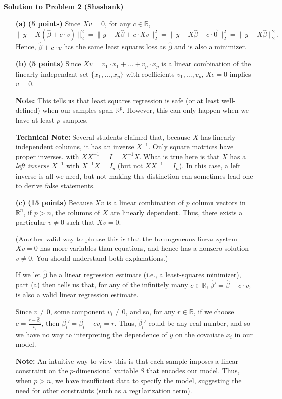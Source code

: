 \documentclass[11pt]{article}
\newcommand{\R}{\mathbb{R}}
\def\inv{^{-1}}
\begin{document}
\begin{framed}
{\bf\large Solution to Problem 2 (Shashank)}

\begin{enumerate}
\item[{\bf (a)}] {\bf (5 points)}
Since $Xv = 0$, for any $c \in \R$,
\[\|y - X(\hat\beta + c \cdot v)\|_2^2
    = \|y - X\hat\beta + c \cdot Xv\|_2^2
    = \|y - X\hat\beta + c \cdot \vec 0\|_2^2
    = \|y - X\hat\beta\|_2^2.
\]
Hence, $\hat\beta + c \cdot v$ has the same least squares loss as $\hat\beta$
and is also a minimizer.

\item[{\bf (b)}] {\bf (5 points)}
Since $Xv = v_1 \cdot x_1 + \dots + v_p \cdot x_p$ is a linear combination of
the linearly independent set $\{x_1,\dots,x_p\}$ with coefficients
$v_1,\dots,v_p$, $Xv = 0$ implies $v = 0$.

{\bf Note:} This tells us that least squares regression is safe (or at
least well-defined) when our samples span $\R^p$. However, this can only happen
when we have at least $p$ samples.

{\bf Technical Note:} Several students claimed that, because $X$ has linearly
independent columns, it has an inverse $X\inv$. Only square matrices have
proper inverses, with $XX\inv = I = X\inv X$. What is true here is that $X$ has
a \emph{left inverse} $X\inv$ with $X\inv X = I_p$ (but not $XX\inv = I_n$). In
this case, a left inverse is all we need, but not making this distinction can
sometimes lead one to derive false statements.

\item[{\bf (c)}] {\bf (15 points)} Because $Xv$ is a linear combination of $p$
column vectors in $\R^n$, if $p > n$, the columns of $X$ are linearly
dependent. Thus, there exists a particular $v \neq 0$ such that $Xv = 0$.

(Another valid way to phrase this is that the homogeneous linear
system $Xv = 0$ has more variables than equations, and hence has a nonzero
solution $v \neq 0$. You should understand both explanations.)

If we let $\hat\beta$ be a linear regression estimate (i.e., a least-squares
minimizer), part (a) then tells us that, for any of the infinitely many
$c \in \R$, $\hat\beta' = \hat\beta + c \cdot v$, is also a valid linear
regression estimate.

Since $v \neq 0$, some component $v_i \neq 0$, and so, for any $r \in \R$, if
we choose $c = \frac{r - \hat\beta_i}{v_i}$, then
$\hat\beta_i' = \hat\beta_i + c v_i = r$. Thus, $\hat\beta_i'$ could be any
real number, and so we have no way to interpreting the dependence of $y$ on the
covariate $x_i$ in our model.

{\bf Note:} An intuitive way to view this is that each sample imposes a linear
constraint on the $p$-dimensional variable $\beta$ that encodes our model.
Thus, when $p > n$, we have insufficient data to specify the model, suggesting
the need for other constraints (such as a regularization term).
\end{enumerate}
\end{framed}
\end{document}
